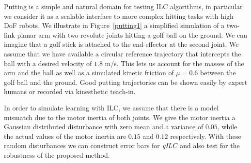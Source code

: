 Putting is a simple and natural domain for testing ILC algorithms, in particular we consider it as a scalable interface to more complex hitting tasks with high DoF robots. We illustrate in Figure~\ref{putting1} a simplified simulation of a two-link planar arm with two revolute joints hitting a golf ball on the ground. We can imagine that a golf stick is attached to the end-effector at the second joint. We assume that we have available a circular reference trajectory that intercepts the ball with a desired velocity of $1.8$ m/s. This lets us account for the masses of the arm and the ball as well as a simulated kinetic friction of $\mu = 0.6$ between the golf ball and the ground. Good putting trajectories can be shown easily by expert humans or recorded via kinesthetic teach-in. 

In order to simulate learning with ILC, we assume that there is a model mismatch due to the motor inertia of both joints. We give the motor inertia a Gaussian distributed disturbance with zero mean and a variance of $0.05$, while the actual values of the motor inertia are $0.15$ and $0.12$ respectively. With these random disturbances we can construct error bars for $\emph{gILC}$ and also test for the robustness of the proposed method.

